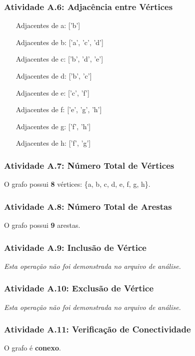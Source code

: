 \documentclass[a4paper,12pt]{article}
\begin{document}
\subsubsection*{Atividade A.6: Adjacência entre Vértices}
\begin{itemize}[align=left, leftmargin=40pt, labelsep=1em]
    \item[Adjacentes de a:] ['b']
    \item[Adjacentes de b:] ['a', 'c', 'd']
    \item[Adjacentes de c:] ['b', 'd', 'e']
    \item[Adjacentes de d:] ['b', 'c']
    \item[Adjacentes de e:] ['c', 'f']
    \item[Adjacentes de f:] ['e', 'g', 'h']
    \item[Adjacentes de g:] ['f', 'h']
    \item[Adjacentes de h:] ['f', 'g']
\end{itemize}

\subsubsection*{Atividade A.7: Número Total de Vértices}
O grafo possui \textbf{8} vértices: \{a, b, c, d, e, f, g, h\}.

\subsubsection*{Atividade A.8: Número Total de Arestas}
O grafo possui \textbf{9} arestas.

\subsubsection*{Atividade A.9: Inclusão de Vértice}
\textit{Esta operação não foi demonstrada no arquivo de análise.}

\subsubsection*{Atividade A.10: Exclusão de Vértice}
\textit{Esta operação não foi demonstrada no arquivo de análise.}

\subsubsection*{Atividade A.11: Verificação de Conectividade}
O grafo é \textbf{conexo}.
\end{document}
